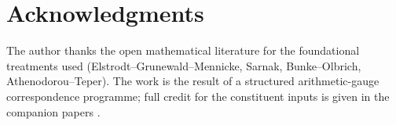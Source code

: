 \documentclass[11pt,a4paper,reqno]{amsart}
\theoremstyle{definition}
\begin{document}
\section{Acknowledgments}\label{sec:acks}

The author thanks the open mathematical literature for the foundational treatments used (Elstrodt--Grunewald--Mennicke, Sarnak, Bunke--Olbrich, Athenodorou--Teper). The work is the result of a structured arithmetic-gauge correspondence programme; full credit for the constituent inputs is given in the companion papers \cite{Remondiere2026Selberg, Remondiere2026CenterRank, Remondiere2026CR, Remondiere2026RouteB}.



\end{document}
